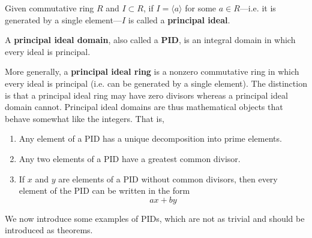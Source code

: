  \begin{definition}
    Given commutative ring $R$ and $I \subset R$, if $I = \langle a \rangle$ for some $a \in R$---i.e. it is generated by a single element---$I$ is called a \textbf{principal ideal}. 
  \end{definition}

  \begin{definition}
    A \textbf{principal ideal domain}, also called a \textbf{PID}, is an integral domain in which every ideal is principal. 
  \end{definition}

  More generally, a \textbf{principal ideal ring} is a nonzero commutative ring in which every ideal is principal (i.e. can be generated by a single element). The distinction is that a principal ideal ring may have zero divisors whereas a principal ideal domain cannot. Principal ideal domains are thus mathematical objects that behave somewhat like the integers. That is, 
  \begin{enumerate}
    \item Any element of a PID has a unique decomposition into prime elements. 
    \item Any two elements of a PID have a greatest common divisor. 
    \item If $x$ and $y$ are elements of a PID without common divisors, then every element of the PID can be written in the form 
      \begin{equation}
        a x + b y
      \end{equation}
  \end{enumerate}

  We now introduce some examples of PIDs, which are not as trivial and should be introduced as theorems. 

